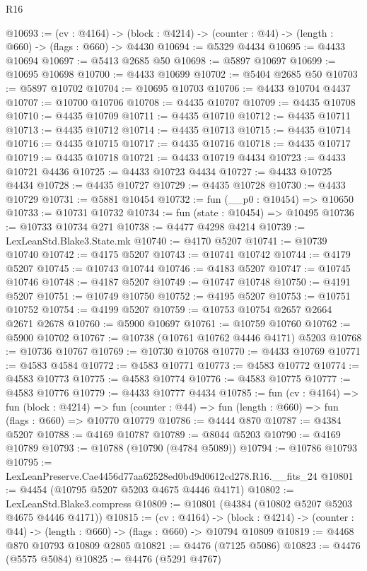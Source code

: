 \begin{lexlean}{R16}
\begin{coremodule}
@10693 := (cv : @4164) ->
  (block : @4214) -> (counter : @44) -> (length : @660) -> (flags : @660) -> @4430
@10694 := @5329 @4434
@10695 := @4433 @10694
@10697 := @5413 @2685 @50
@10698 := @5897 @10697
@10699 := @10695 @10698
@10700 := @4433 @10699
@10702 := @5404 @2685 @50
@10703 := @5897 @10702
@10704 := @10695 @10703
@10706 := @4433 @10704 @4437
@10707 := @10700 @10706
@10708 := @4435 @10707
@10709 := @4435 @10708
@10710 := @4435 @10709
@10711 := @4435 @10710
@10712 := @4435 @10711
@10713 := @4435 @10712
@10714 := @4435 @10713
@10715 := @4435 @10714
@10716 := @4435 @10715
@10717 := @4435 @10716
@10718 := @4435 @10717
@10719 := @4435 @10718
@10721 := @4433 @10719 @4434
@10723 := @4433 @10721 @4436
@10725 := @4433 @10723 @4434
@10727 := @4433 @10725 @4434
@10728 := @4435 @10727
@10729 := @4435 @10728
@10730 := @4433 @10729
@10731 := @5881 @10454
@10732 := fun (__p0 : @10454) => @10650
@10733 := @10731 @10732
@10734 := fun (state : @10454) => @10495
@10736 := @10733 @10734 @271
@10738 := @4477 @4298 @4214
@10739 := LexLeanStd.Blake3.State.mk
@10740 := @4170 @5207
@10741 := @10739 @10740
@10742 := @4175 @5207
@10743 := @10741 @10742
@10744 := @4179 @5207
@10745 := @10743 @10744
@10746 := @4183 @5207
@10747 := @10745 @10746
@10748 := @4187 @5207
@10749 := @10747 @10748
@10750 := @4191 @5207
@10751 := @10749 @10750
@10752 := @4195 @5207
@10753 := @10751 @10752
@10754 := @4199 @5207
@10759 := @10753 @10754 @2657 @2664 @2671 @2678
@10760 := @5900 @10697
@10761 := @10759 @10760
@10762 := @5900 @10702
@10767 := @10738 (@10761 @10762 @4446 @4171) @5203
@10768 := @10736 @10767
@10769 := @10730 @10768
@10770 := @4433 @10769
@10771 := @4583 @4584
@10772 := @4583 @10771
@10773 := @4583 @10772
@10774 := @4583 @10773
@10775 := @4583 @10774
@10776 := @4583 @10775
@10777 := @4583 @10776
@10779 := @4433 @10777 @4434
@10785 := fun (cv : @4164) =>
  fun (block : @4214) =>
  fun (counter : @44) => fun (length : @660) => fun (flags : @660) => @10770 @10779
@10786 := @4444 @870
@10787 := @4384 @5207
@10788 := @4169 @10787
@10789 := @8044 @5203
@10790 := @4169 @10789
@10793 := @10788 (@10790 (@4784 @5089))
@10794 := @10786 @10793
@10795 := LexLeanPreserve.Cae4456d77aa62528ed0bd9d0612cd278.R16.__fits_24
@10801 := @4454 (@10795 @5207 @5203 @4675 @4446 @4171)
@10802 := LexLeanStd.Blake3.compress
@10809 := @10801 (@4384 (@10802 @5207 @5203 @4675 @4446 @4171))
@10815 := (cv : @4164) ->
  (block : @4214) -> (counter : @44) -> (length : @660) -> (flags : @660) -> @10794 @10809
@10819 := @4468 @870 @10793 @10809 @2805
@10821 := @4476 (@7125 @5086)
@10823 := @4476 (@5575 @5084)
@10825 := @4476 (@5291 @4767)

\end{coremodule}
\end{lexlean}

